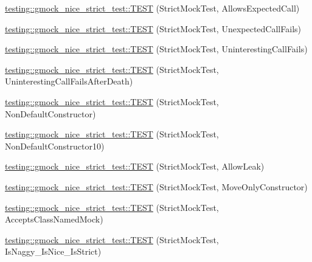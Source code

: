 \begin{DoxyCompactItemize}
\mbox{\hyperlink{namespacetesting_1_1gmock__nice__strict__test_a269b7756fb785a84a609543700f77256}{testing\+::gmock\+\_\+nice\+\_\+strict\+\_\+test\+::\+T\+E\+ST}} (Strict\+Mock\+Test, Allows\+Expected\+Call)
\item 
\mbox{\hyperlink{namespacetesting_1_1gmock__nice__strict__test_ae58ab074e0f9218a727d1fec0793667e}{testing\+::gmock\+\_\+nice\+\_\+strict\+\_\+test\+::\+T\+E\+ST}} (Strict\+Mock\+Test, Unexpected\+Call\+Fails)
\item 
\mbox{\hyperlink{namespacetesting_1_1gmock__nice__strict__test_afea105507ce78fc0e2c20d9f4cca16d7}{testing\+::gmock\+\_\+nice\+\_\+strict\+\_\+test\+::\+T\+E\+ST}} (Strict\+Mock\+Test, Uninteresting\+Call\+Fails)
\item 
\mbox{\hyperlink{namespacetesting_1_1gmock__nice__strict__test_a04e9402fd03549e1eda88659b6eac174}{testing\+::gmock\+\_\+nice\+\_\+strict\+\_\+test\+::\+T\+E\+ST}} (Strict\+Mock\+Test, Uninteresting\+Call\+Fails\+After\+Death)
\item 
\mbox{\hyperlink{namespacetesting_1_1gmock__nice__strict__test_a21456158013d707a1238d0ade00ea3f6}{testing\+::gmock\+\_\+nice\+\_\+strict\+\_\+test\+::\+T\+E\+ST}} (Strict\+Mock\+Test, Non\+Default\+Constructor)
\item 
\mbox{\hyperlink{namespacetesting_1_1gmock__nice__strict__test_ae52f11a6045e9c307237cf02b85e6b79}{testing\+::gmock\+\_\+nice\+\_\+strict\+\_\+test\+::\+T\+E\+ST}} (Strict\+Mock\+Test, Non\+Default\+Constructor10)
\item 
\mbox{\hyperlink{namespacetesting_1_1gmock__nice__strict__test_a5f8498b9a90a81c4709b8d3ae968500e}{testing\+::gmock\+\_\+nice\+\_\+strict\+\_\+test\+::\+T\+E\+ST}} (Strict\+Mock\+Test, Allow\+Leak)
\item 
\mbox{\hyperlink{namespacetesting_1_1gmock__nice__strict__test_a2e8eee23ea869ebc5224e014b616d409}{testing\+::gmock\+\_\+nice\+\_\+strict\+\_\+test\+::\+T\+E\+ST}} (Strict\+Mock\+Test, Move\+Only\+Constructor)
\item 
\mbox{\hyperlink{namespacetesting_1_1gmock__nice__strict__test_a4534bdd7c8ca19aad56933d34e0ea4db}{testing\+::gmock\+\_\+nice\+\_\+strict\+\_\+test\+::\+T\+E\+ST}} (Strict\+Mock\+Test, Accepts\+Class\+Named\+Mock)
\item 
\mbox{\hyperlink{namespacetesting_1_1gmock__nice__strict__test_a79dd179124eda7c24cf55a6f128a97bc}{testing\+::gmock\+\_\+nice\+\_\+strict\+\_\+test\+::\+T\+E\+ST}} (Strict\+Mock\+Test, Is\+Naggy\+\_\+\+Is\+Nice\+\_\+\+Is\+Strict)
\end{DoxyCompactItemize}
